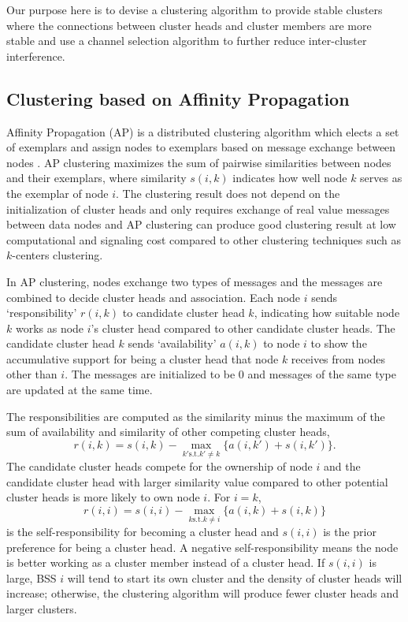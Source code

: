 \documentclass[10pt, conference, letterpaper]{IEEEtran}
\begin{document}
Our purpose here is to devise a clustering algorithm to provide stable clusters where the connections between cluster heads and cluster members are more stable and use a channel selection algorithm to further reduce inter-cluster interference.

\subsection{Clustering based on Affinity Propagation}
Affinity Propagation (AP) \cite{apcluster} is a distributed clustering algorithm which elects a set of exemplars and assign nodes to exemplars based on message exchange between nodes . AP clustering maximizes the sum of pairwise similarities between nodes and their exemplars, where similarity $s(i,k)$ indicates how well node $k$ serves as the exemplar of node $i$. The clustering result does not depend on the initialization of cluster heads and only requires exchange of real value messages between data nodes and AP clustering can produce good clustering result at low computational and signaling cost compared to other clustering techniques such as $k$-centers clustering.

In AP clustering, nodes exchange two types of messages and the messages are combined to decide cluster heads and association. Each node $i$ sends `responsibility' $r(i,k)$ to candidate cluster head $k$, indicating how suitable node $k$ works as node $i$'s cluster head compared to other candidate cluster heads. The candidate cluster head $k$ sends `availability' $a(i,k)$ to node $i$ to show the accumulative support for being a cluster head that node $k$ receives from nodes other than $i$. The messages are initialized to be 0 and messages of the same type are updated at the same time. 

The responsibilities are computed as the similarity minus the maximum of the sum of availability and similarity of other competing cluster heads,
\begin{equation}\label{eq:r_update}
r(i,k) = s(i,k) - \max_{k'\text{s.t.}k'\neq k}\{a(i,k') + s(i,k')\}.
\end{equation}
The candidate cluster heads compete for the ownership of node $i$ and the candidate cluster head with larger similarity value compared to other potential cluster heads is more likely to own node $i$. For $i = k$, 
$$r(i,i) = s(i,i) - \max_{k\text{s.t.}k\neq i}\{a(i,k) + s(i,k)\}$$ is the self-responsibility for becoming a cluster head and $s(i,i)$ is the prior preference for being a cluster head. A negative self-responsibility means the node is better working as a cluster member instead of a cluster head. If $s(i,i)$ is large, BSS $i$ will tend to start its own cluster and the density of cluster heads will increase; otherwise, the clustering algorithm will produce fewer cluster heads and larger clusters.
\end{document}
